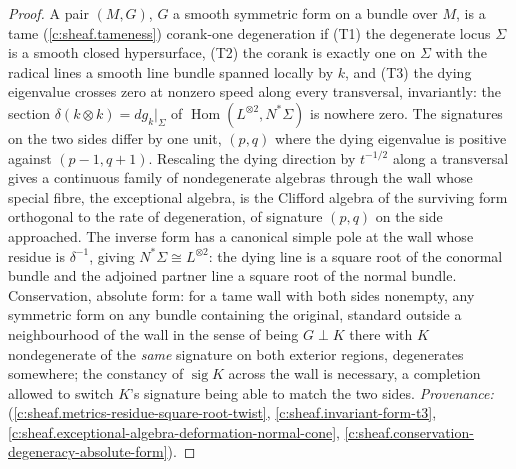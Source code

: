 \documentclass[11pt]{article}
\theoremstyle{definition}
\theoremstyle{plain}
\begin{document}
\begin{proof}
A pair $(M,G)$, $G$ a smooth symmetric form on a bundle over $M$, is a tame (\ref{c:sheaf.tameness}) corank-one degeneration if (T1) the degenerate locus $\Sigma$ is a smooth closed hypersurface, (T2) the corank is exactly one on $\Sigma$ with the radical lines a smooth line bundle spanned locally by $k$, and (T3) the dying eigenvalue crosses zero at nonzero speed along every transversal, invariantly: the section $\delta(k \otimes k) = dg_{k}|_{\Sigma}$ of $\operatorname{Hom}(L^{\otimes 2}, N^{*}\Sigma)$ is nowhere zero. The signatures on the two sides differ by one unit, $(p,q)$ where the dying eigenvalue is positive against $(p-1, q+1)$. Rescaling the dying direction by $t^{-1/2}$ along a transversal gives a continuous family of nondegenerate algebras through the wall whose special fibre, the exceptional algebra, is the Clifford algebra of the surviving form orthogonal to the rate of degeneration, of signature $(p,q)$ on the side approached. The inverse form has a canonical simple pole at the wall whose residue is $\delta^{-1}$, giving $N^{*}\Sigma \cong L^{\otimes 2}$: the dying line is a square root of the conormal bundle and the adjoined partner line a square root of the normal bundle. Conservation, absolute form: for a tame wall with both sides nonempty, any symmetric form on any bundle containing the original, standard outside a neighbourhood of the wall in the sense of being $G \perp K$ there with $K$ nondegenerate of the \emph{same} signature on both exterior regions, degenerates somewhere; the constancy of $\operatorname{sig} K$ across the wall is necessary, a completion allowed to switch $K$'s signature being able to match the two sides. \emph{Provenance:} \cite[Hyp.~2.1, Lem.~2.2, Rem.~2.3, Prop.~6.1, Thm.~6.2, Thm.~5.1]{ButlerT4} (\ref{c:sheaf.metrics-residue-square-root-twist}, \ref{c:sheaf.invariant-form-t3}, \ref{c:sheaf.exceptional-algebra-deformation-normal-cone}, \ref{c:sheaf.conservation-degeneracy-absolute-form}).

\end{proof}
\end{document}
